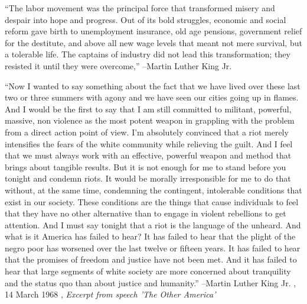\documentclass{article}%
\begin{document}
\linebreak%
\vspace{1mm}%
\begin{minipage}{\textwidth}%
\flushleft%
“The labor movement was the principal force that transformed misery and despair into hope and progress. Out of its bold struggles, economic and social reform gave birth to unemployment insurance, old age pensions, government relief for the destitute, and above all new wage levels that meant not mere survival, but a tolerable life. The captains of industry did not lead this transformation; they resisted it until they were overcome,”%
\linebreak%
\vspace{1mm}%
–Martin Luther King Jr.%
\linebreak%
\vspace{1mm}%
\end{minipage}%
\linebreak%
\vspace{1mm}%
\begin{minipage}{\textwidth}%
\flushleft%
“Now I wanted to say something about the fact that we have lived over these last two or three summers with agony and we have seen our cities going up in flames. And I would be the first to say that I am still committed to militant, powerful, massive, non violence as the most potent weapon in grappling with the problem from a direct action point of view. I'm absolutely convinced that a riot merely intensifies the fears of the white community while relieving the guilt. And I feel that we must always work with an effective, powerful weapon and method that brings about tangible results. But it is not enough for me to stand before you tonight and condemn riots. It would be morally irresponsible for me to do that without, at the same time, condemning the contingent, intolerable conditions that exist in our society. These conditions are the things that cause individuals to feel that they have no other alternative than to engage in violent rebellions to get attention. And I must say tonight that a riot is the language of the unheard. And what is it America has failed to hear? It has failed to hear that the plight of the negro poor has worsened over the last twelve or fifteen years. It has failed to hear that the promises of freedom and justice have not been met. And it has failed to hear that large segments of white society are more concerned about tranquility and the status quo than about justice and humanity.”%
\linebreak%
\vspace{1mm}%
–Martin Luther King Jr.%
, 14 March 1968%
, \textit{Excerpt from speech 'The Other America'}%
\linebreak%
\vspace{1mm}%
\end{minipage}%
\end{document}
